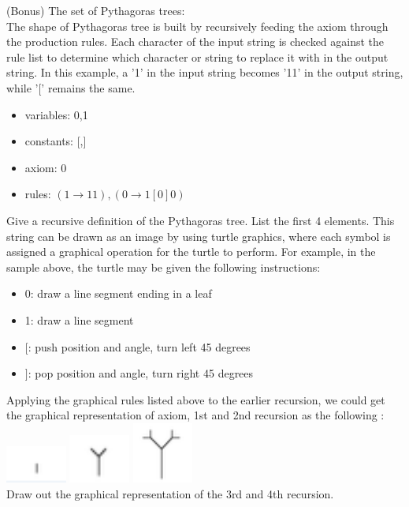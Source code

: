 \documentclass[solution, letterpaper]{cs20inclass}
\begin{document}
\problem (Bonus) The set of Pythagoras trees:\\
The shape of Pythagoras tree is built by recursively feeding the axiom through the production rules. Each character of the input string is checked against the rule list to determine which character or string to replace it with in the output string. In this example, a '1' in the input string becomes '11' in the output string, while '[' remains the same. 
\begin{itemize}
\item variables: 0,1
\item constants: [,]
\item axiom: 0
\item rules: $(1\rightarrow 11), (0\rightarrow 1[0]0)$
\end{itemize}
\subproblem Give a recursive definition of the  Pythagoras tree.
\subproblem List the first 4 elements.
\subproblem This string can be drawn as an image by using turtle graphics, where each symbol is assigned a graphical operation for the turtle to perform. For example, in the sample above, the turtle may be given the following instructions:
\begin{itemize}
\item 0: draw a line segment ending in a leaf
\item 1: draw a line segment
\item $[$: push position and angle, turn left 45 degrees
\item $]$: pop position and angle, turn right 45 degrees
\end{itemize}
Applying the graphical rules listed above to the earlier recursion, we could get the graphical representation of axiom, 1st and 2nd recursion as the following :\\
\includegraphics[width=2cm]{0} 
\includegraphics[width=2cm]{1}
\includegraphics[width=2cm]{2}\\
Draw out the graphical representation of the 3rd and 4th recursion.
\end{document}
